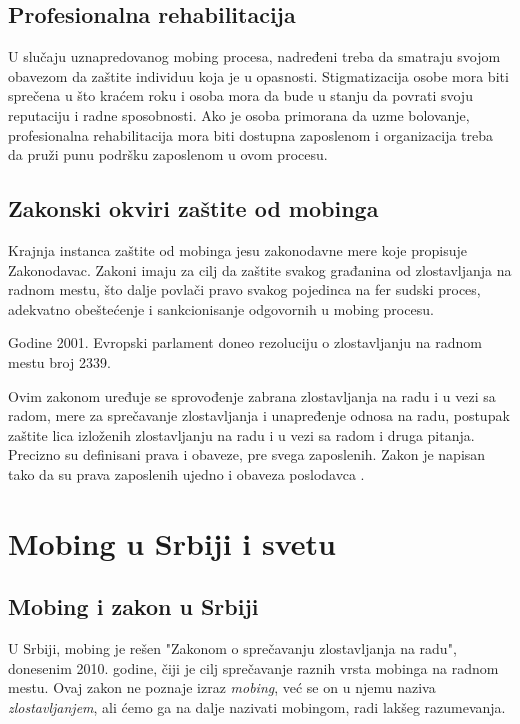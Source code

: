 \documentclass[a4paper]{article}
\newcommand{\quotes}[1]{"#1"}
\begin{document}
    \subsection{Profesionalna rehabilitacija}
    U slučaju uznapredovanog mobing procesa, nadređeni treba da smatraju svojom obavezom da zaštite individuu koja je u opasnosti. Stigmatizacija osobe mora biti sprečena u što kraćem roku i osoba mora da bude u stanju da povrati svoju reputaciju i radne sposobnosti. Ako je osoba primorana da uzme bolovanje, profesionalna rehabilitacija mora biti dostupna zaposlenom i organizacija treba da pruži punu podršku zaposlenom u ovom procesu.

    \subsection{Zakonski okviri zaštite od mobinga}
    Krajnja instanca zaštite od mobinga jesu zakonodavne mere koje propisuje Zakonodavac. Zakoni imaju za cilj da zaštite svakog građanina od zlostavljanja na radnom mestu, što dalje povlači pravo svakog pojedinca na fer sudski proces, adekvatno obeštećenje i sankcionisanje odgovornih u mobing procesu.

    Godine 2001. Evropski parlament doneo rezoluciju o zlostavljanju na radnom mestu broj 2339.

    Ovim zakonom uređuje se sprovođenje zabrana zlostavljanja na radu i u vezi sa radom, mere za sprečavanje zlostavljanja i unapređenje odnosa na radu, postupak zaštite lica izloženih zlostavljanju na radu i u vezi sa radom i druga pitanja. Precizno su definisani prava i obaveze, pre svega zaposlenih. Zakon je napisan tako da su prava zaposlenih ujedno i obaveza poslodavca .

    \section{Mobing u Srbiji i svetu}
    
    \subsection{Mobing i zakon u Srbiji}
    
    U Srbiji, mobing je rešen \quotes{Zakonom o sprečavanju zlostavljanja na radu}, donesenim 2010. godine, čiji je cilj sprečavanje raznih vrsta mobinga na radnom mestu. Ovaj zakon ne poznaje izraz \textit{mobing}, već se on u njemu naziva \textit{zlostavljanjem}, ali ćemo ga na dalje nazivati mobingom, radi lakšeg razumevanja.
    
\end{document}
